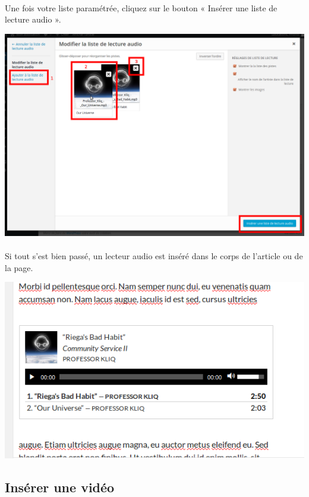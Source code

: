 \documentclass[10pt,a4paper]{article}
\begin{document}
\paragraph{}Une fois votre liste paramétrée, cliquez sur le bouton « Insérer une liste de lecture audio ».
\begin{center}
\includegraphics[scale=0.25]{img/0124.png}
\end{center}
\paragraph{}Si tout s'est bien passé, un lecteur audio est inséré dans le corps de l'article ou de la page.
\begin{center}
\includegraphics[scale=0.3]{img/0125.png}
\end{center}
\newpage
\subsection{Insérer une vidéo}
\end{document}
